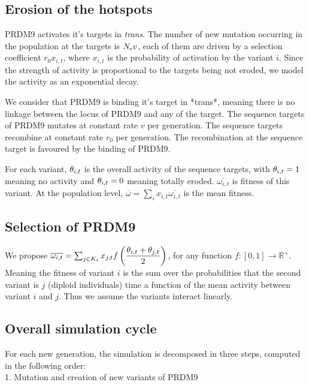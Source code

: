 \documentclass{article}
\begin{document}
\subsection*{Erosion of the hotspots}

PRDM9 activates it's targets in \textit{trans}. The number of new mutation occurring in the population at the targets is $ N_\mathrm{e} v$, each of them are driven by a selection coefficient $ r _0  x_{i,t}$, where $x_{i,t}$ is the probability of activation by the variant $i$.
Since the strength of activity is proportional to the targets being not eroded, we model the activity as an exponential decay.

We consider that PRDM9 is binding it's target in *trans*, meaning there is no linkage between the locus of PRDM9 and any of the target. The sequence targets of PRDM9 mutates at constant rate $v$ per generation. The sequence targets recombine at constant rate $r_0$ per generation. The recombination at the sequence target is favoured by the binding of PRDM9.

For each variant, $\theta _{i,t}$ is the overall activity of the sequence targets, with $\theta _{i,t}=1$ meaning no activity and $\theta _{i,t}=0$ meaning totally eroded. $\overline{\omega_{i,t}}$ is fitness of this variant. At the population level, $\overline{\omega}=\sum_{i} x_{i,t} \overline{\omega_{i,t}}$ is the mean fitness.

\subsection*{Selection of PRDM9}

We propose $\overline{\omega_{i,t}}=\sum_{j \in K_{t}} x_{j,t} f \left( \dfrac{\theta _{i,t} + \theta _{j,t}}{2} \right)$, for any function $f\colon [0,1] \rightarrow \mathbb{R}^+$. Meaning the fitness of variant $i$ is the sum over the probabilities that the second variant is $j$ (diploid individuals) time a function of the mean activity between variant $i$ and $j$. Thus we assume the variants interact linearly.

\subsection*{Overall simulation cycle} 

For each new generation, the simulation is decomposed in three steps, computed in the following order: \\

1. Mutation and creation of new variants of PRDM9 
\end{document}
